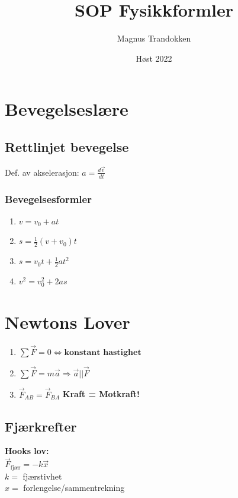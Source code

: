 \documentclass[12pt]{article}
\title{SOP Fysikkformler}
\author{Magnus Trandokken}
\date{Høst 2022}
\begin{document}

\centering
{}
\maketitle

\newpage
{}
\RaggedRight
\tableofcontents
\newpage

\section{Bevegelseslære}
\subsection{Rettlinjet bevegelse}
Def. av akselerasjon: $a = \frac{d\Vec{v}}{dt}$

\subsubsection{Bevegelsesformler}
\begin{enumerate}
    \item $v = v_0+at$
    \item $s = \frac{1}{2}(v+v_0)t$
    \item $s = v_0t+\frac{1}{2}at^2$
    \item $v^2 = v_0^2+2as$
\end{enumerate}
\section{Newtons Lover}
\begin{enumerate}
    \item $\sum{\Vec{F}} = 0 \Leftrightarrow \textbf{konstant hastighet }$
    \item $\sum{\Vec{F}} = m\Vec{a} \Rightarrow \Vec{a} || \Vec{F}$
    \item $\Vec{F}_{AB} = \Vec{F}_{BA}$ \textbf{Kraft = Motkraft!}
\end{enumerate}
\subsection{Fjærkrefter}
\textbf{Hooks lov: }\\ $\Vec{F}_{\text{fjær}} = -k\Vec{x}$\\
$k =$ fjærstivhet\\ $x =$ forlengelse/sammentrekning
\end{document}
